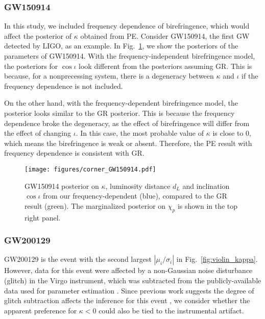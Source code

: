 \documentclass[aps,prd,twocolumn,superscriptaddress,preprintnumbers,floatfix,nofootinbib]{revtex4-2}
\begin{document}
\subsubsection{GW150914}
In this study, we included frequency dependence of birefringence, which would affect the posterior of $\kappa$ obtained from \ac{PE}.
Consider GW150914, the first GW detected by LIGO, as an example.
In Fig.~\ref{fig:corner_GW150914}, we show the posteriors of the parameters of GW150914.
With the frequency-independent birefringence model, the posteriors for $\cos\iota$ look different from the posteriors assuming GR.
This is because, for a nonprecessing system, there is a degeneracy between $\kappa$ and $\iota$ if the frequency dependence is not included.

On the other hand, with the frequency-dependent birefringence model, the posterior looks similar to the GR posterior.
This is because the frequency dependence broke the degeneracy, as the effect of birefringence will differ from the effect of changing $\iota$.
In this case, the most probable value of $\kappa$ is close to $0$, which means the birefringence is weak or absent.
Therefore, the \ac{PE} result with frequency dependence is consistent with GR.

\begin{figure}
    \texttt{[image: figures/corner\_GW150914.pdf]}
    \caption{
        GW150914 posterior on $\kappa$, luminosity distance $d_L$ and inclination $\cos\iota$ from our frequency-dependent (blue), compared to the GR result (green).
        The marginalized posterior on $\chi_p$ is shown in the top right panel.
    }
    \label{fig:corner_GW150914}
\end{figure}

\subsubsection{GW200129}
\label{sec:GW200129}

GW200129 is the event with the second largest $|\mu_i/\sigma_i|$ in Fig.~\ref{fig:violin_kappa}.
However, data for this event were affected by a non-Gaussian noise disturbance (glitch) in the Virgo instrument, which was subtracted from the publicly-available data used for parameter estimation \cite{Davis:2022ird}.
Since previous work suggests the degree of glitch subtraction affects the inference for this event \citep{GW200129_glitch}, we consider whether the apparent preference for $\kappa < 0$ could also be tied to the instrumental artifact.
\end{document}

